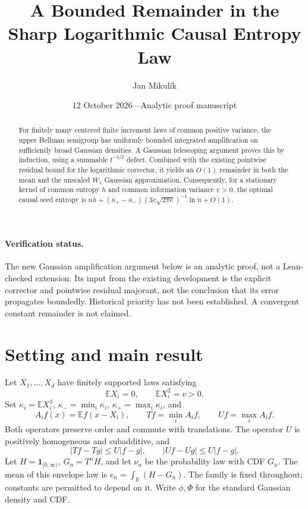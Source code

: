\documentclass[11pt]{article}
\title{A Bounded Remainder in the\protect\\Sharp Logarithmic Causal Entropy Law}
\author{Jan Mikul\'ik}
\date{12 October 2026\quad---\quad Analytic proof manuscript}
\newcommand{\E}{\mathbb E}
\newcommand{\R}{\mathbb R}
\begin{document}
\maketitle
\begin{abstract}
For finitely many centered finite increment laws of common positive
variance, the upper Bellman semigroup has uniformly bounded integrated
amplification on sufficiently broad Gaussian densities. A Gaussian
telescoping argument proves this by induction, using a summable
$t^{-3/2}$ defect. Combined with the existing pointwise residual bound
for the logarithmic corrector, it yields an $O(1)$ remainder in both
the mean and the unscaled $W_1$ Gaussian approximation. Consequently,
for a stationary kernel of common entropy $h$ and common information
variance $v>0$, the optimal causal seed entropy is
$nh+(\kappa_+-\kappa_-)(3v\sqrt{2\pi e})^{-1}\ln n+O(1)$.
\end{abstract}

\paragraph{Verification status.}
The new Gaussian amplification argument below is an analytic proof,
not a Lean-checked extension. Its input from the existing development
is the explicit corrector and pointwise residual majorant, not the
conclusion that its error propagates boundedly. Historical priority
has not been established. A convergent constant remainder is not claimed.

\section{Setting and main result}
Let $X_1,\ldots,X_d$ have finitely supported laws satisfying
\[
 \E X_i=0,\qquad \E X_i^2=v>0.
\]
Set $\kappa_i=\E X_i^3$, $\kappa_-=\min_i\kappa_i$,
$\kappa_+=\max_i\kappa_i$, and
\[
 A_i f(x)=\E f(x-X_i),\qquad
 Tf=\min_i A_i f,\qquad Uf=\max_i A_i f.
\]
Both operators preserve order and commute with translations. The
operator $U$ is positively homogeneous and subadditive, and
\begin{equation}\label{eq:lip}
 |Tf-Tg|\le U|f-g|,\qquad |Uf-Ug|\le U|f-g|.
\end{equation}
Let $H=\mathbf1_{[0,\infty)}$, $G_n=T^nH$, and let $\nu_n$ be the
probability law with CDF $G_n$. The mean of this envelope law is
$e_n=\int_\R(H-G_n)$. The family is fixed throughout; constants
are permitted to depend on it. Write $\phi,\Phi$ for the standard
Gaussian density and CDF.
\end{document}
